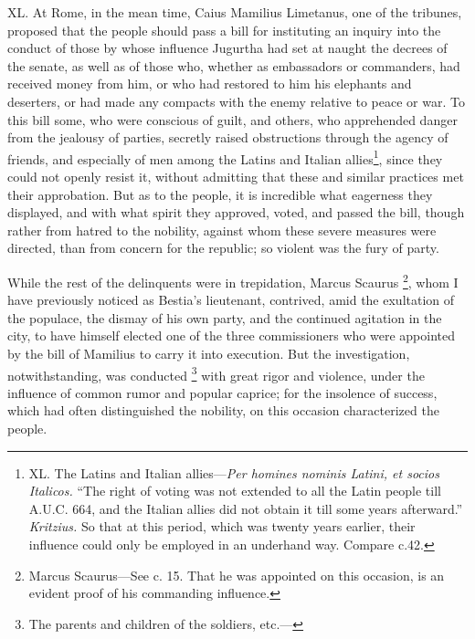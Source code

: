 XL. At Rome, in the mean time, Caius Mamilius Limetanus, one of the
tribunes, proposed that the people should pass a bill for instituting
an inquiry into the conduct of those by whose influence Jugurtha had
set at naught the decrees of the senate, as well as of those who,
whether as embassadors or commanders, had received money from him, or
who had restored to him his elephants and deserters, or had made any
compacts with the enemy relative to peace or war. To this bill some,
who were conscious of guilt, and others, who apprehended danger from
the jealousy of parties, secretly raised obstructions through the
agency of friends, and especially of men among the Latins and Italian
allies\footnote{XL. The Latins and Italian allies—\emph{Per homines nominis Latini,
et socios Italicos.} ``The right of voting was not extended to all
the Latin people till A.U.C. 664, and the Italian allies did not
obtain it till some years afterward.'' \emph{Kritzius.} So that at this
period, which was twenty years earlier, their influence could only be
employed in an underhand way. Compare c.42.}, since they could not openly resist it, without admitting
that these and similar practices met their approbation. But as to the
people, it is incredible what eagerness they displayed, and with what
spirit they approved, voted, and passed the bill, though rather from
hatred to the nobility, against whom these severe measures were
directed, than from concern for the republic; so violent was the fury
of party.

While the rest of the delinquents were in trepidation, Marcus Scaurus
\footnote{Marcus Scaurus—See c. 15. That he was appointed on this
occasion, is an evident proof of his commanding influence.}, whom I have previously noticed as Bestia's lieutenant,
contrived, amid the exultation of the populace, the dismay of his own
party, and the continued agitation in the city, to have himself
elected one of the three commissioners who were appointed by the bill
of Mamilius to carry it into execution. But the investigation,
notwithstanding, was conducted \footnote{The parents and children of the soldiers, etc.—} with great rigor and violence,
under the influence of common rumor and popular caprice; for the
insolence of success, which had often distinguished the nobility, on
this occasion characterized the people.


